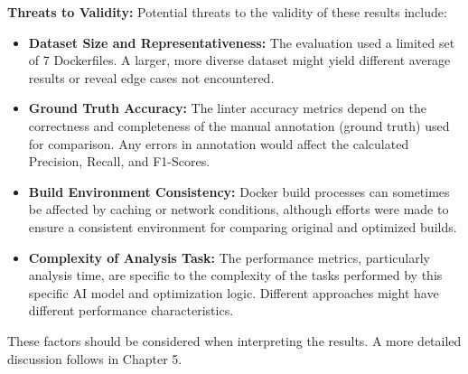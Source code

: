 \textbf{Threats to Validity:}
Potential threats to the validity of these results include:
\begin{itemize}
    \item \textbf{Dataset Size and Representativeness:} The evaluation used a limited set of 7 Dockerfiles. A larger, more diverse dataset might yield different average results or reveal edge cases not encountered.
    \item \textbf{Ground Truth Accuracy:} The linter accuracy metrics depend on the correctness and completeness of the manual annotation (ground truth) used for comparison. Any errors in annotation would affect the calculated Precision, Recall, and F1-Scores.
    \item \textbf{Build Environment Consistency:} Docker build processes can sometimes be affected by caching or network conditions, although efforts were made to ensure a consistent environment for comparing original and optimized builds.
    \item \textbf{Complexity of Analysis Task:} The performance metrics, particularly analysis time, are specific to the complexity of the tasks performed by this specific AI model and optimization logic. Different approaches might have different performance characteristics.
\end{itemize}
These factors should be considered when interpreting the results. A more detailed discussion follows in Chapter 5.
